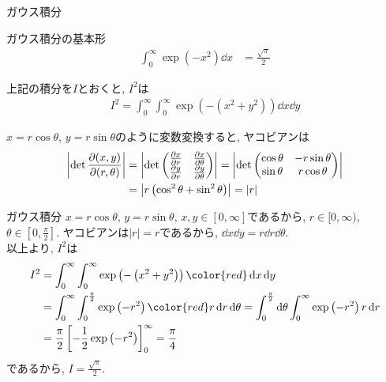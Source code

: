 \documentclass[dvipdfmx,notheorems,t]{beamer}
\begin{document}
\begin{frame}{ガウス積分}
\begin{block}{ガウス積分の基本形}
  \begin{align*}
    \int_0^\infty \exp \left( -x^2 \right) \dd{x} &= \frac{\sqrt{\pi}}{2}
  \end{align*}
\end{block}

上記の積分を$I$とおくと, $I^2$は
\begin{align*}
  I^2 = \int_0^\infty \int_0^\infty \exp \left( - \left( x^2 + y^2 \right) \right) \dd{x} \dd{y}
\end{align*}

$x = r \cos \theta$, $y = r \sin \theta$のように変数変換すると, ヤコビアンは
\begin{align*}
  \left| \det \pdv{(x, y)}{(r, \theta)} \right|
    &= \left| \det \mqty(\pdv{x}{r} & \pdv{x}{\theta} \\ \pdv{y}{r} & \pdv{y}{\theta}) \right|
    = \left| \det \mqty(\cos \theta & -r \sin \theta \\ \sin \theta & r \cos \theta) \right| \\
    &= \left| r \left( \cos^2 \theta + \sin^2 \theta \right) \right| = \left| r \right|
\end{align*}
\end{frame}

\begin{frame}{ガウス積分}
$x = r \cos \theta$, $y = r \sin \theta$, $x, y \in [0, \infty]$であるから,
$r \in [0, \infty)$, $\theta \in [0, \frac{\pi}{2}]$.
ヤコビアンは$\left| r \right| = r$であるから, $\dd{x} \dd{y} = r \dd{r} \dd{\theta}$. \\

以上より, $I^2$は
\begin{align*}
  I^2 &= \int_0^\infty \int_0^\infty \exp \left( - \left( x^2 + y^2 \right) \right)
    {\color{red} \dd{x} \dd{y}} \\
    &= \int_0^\infty \int_0^\frac{\pi}{2} \exp \left( -r^2 \right)
    {\color{red} r \dd{r} \dd{\theta}}
    = \int_0^\frac{\pi}{2} \dd{\theta} \int_0^\infty \exp \left( -r^2 \right) r \dd{r} \\
    &= \frac{\pi}{2} \left[ -\frac{1}{2} \exp \left( -r^2 \right) \right]_0^\infty
    = \frac{\pi}{4}
\end{align*}
であるから, $I = \frac{\sqrt{\pi}}{2}$.
\end{frame}
\end{document}
